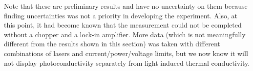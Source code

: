 \documentclass{article}
\begin{document}
Note that these are preliminary results and have no uncertainty on them because finding uncertainties was not a priority in developing the experiment. Also, at this point, it had become known that the measurement could not be completed without a chopper and a lock-in amplifier. More data (which is not meaningfully different from the results shown in this section) was taken with different combinations of lasers and current/power/voltage limits, but we now know it will not display photoconductivity separately from light-induced thermal conductivity.

\printbibliography
\end{document}
